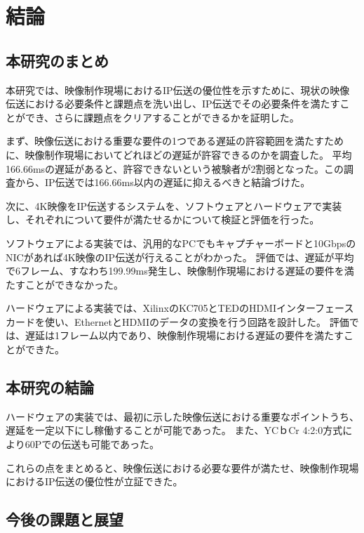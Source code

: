 \chapter{結論}
\label{chap:conclusion}

\section{本研究のまとめ}

本研究では、映像制作現場におけるIP伝送の優位性を示すために、現状の映像伝送における必要条件と課題点を洗い出し、IP伝送でその必要条件を満たすことができ、さらに課題点をクリアすることができるかを証明した。

まず、映像伝送における重要な要件の1つである遅延の許容範囲を満たすために、映像制作現場においてどれほどの遅延が許容できるのかを調査した。
平均166.66msの遅延があると、許容できないという被験者が2割弱となった。この調査から、IP伝送では166.66ms以内の遅延に抑えるべきと結論づけた。

次に、4K映像をIP伝送するシステムを、ソフトウェアとハードウェアで実装し、それぞれについて要件が満たせるかについて検証と評価を行った。

ソフトウェアによる実装では、汎用的なPCでもキャプチャーボードと10GbpsのNICがあれば4K映像のIP伝送が行えることがわかった。
評価では、遅延が平均で6フレーム、すなわち199.99ms発生し、映像制作現場における遅延の要件を満たすことができなかった。

ハードウェアによる実装では、XilinxのKC705とTEDのHDMIインターフェースカードを使い、EthernetとHDMIのデータの変換を行う回路を設計した。
評価では、遅延は1フレーム以内であり、映像制作現場における遅延の要件を満たすことができた。

\section{本研究の結論}

ハードウェアの実装では、最初に示した映像伝送における重要なポイントうち、遅延を一定以下にし稼働することが可能であった。
また、YCｂCr 4:2:0方式により60Pでの伝送も可能であった。

これらの点をまとめると、映像伝送における必要な要件が満たせ、映像制作現場におけるIP伝送の優位性が立証できた。

\section{今後の課題と展望}

